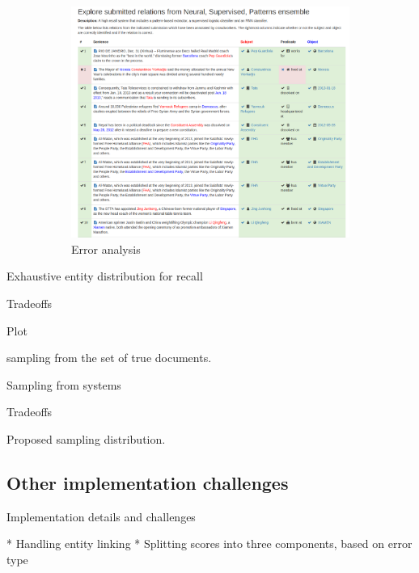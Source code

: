 \begin{figure}
  \begin{subfigure}{0.8\textwidth}
    \includegraphics[width=\textwidth]{figures/interface/errors}
    \caption{Error analysis}
  \end{subfigure}

  \caption[Comparison of relation sampling distributions]{\label{fig:kbpo:selective_supervised_relation}
  }
\end{figure}



Exhaustive entity distribution for recall

Tradeoffs

Plot

sampling from the set of true documents.

Sampling from systems

Tradeoffs

Proposed sampling distribution.

\subsection{Other implementation challenges}

Implementation details and challenges

* Handling entity linking
* Splitting scores into three components, based on error type

